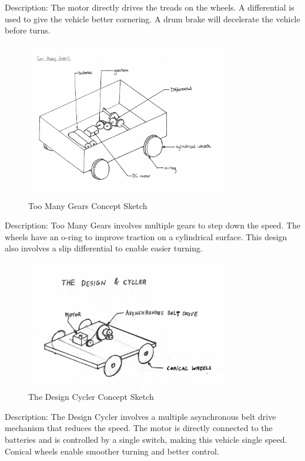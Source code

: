 \documentclass[class=../report, crop=false]{standalone}
\begin{document}
Description: The motor directly drives the treads on the wheels.
A differential is used to give the vehicle better cornering.
A drum brake will decelerate the vehicle before turns.
\clearpage

\begin{figure}[H]
	\centering
	\includegraphics[width=0.8\textwidth]{../../res/img/tmg}
	\caption{Too Many Gears Concept Sketch}
	\label{app/fig:tmg}
\end{figure}

Description: Too Many Gears involves multiple gears to step down the speed.
The wheels have an o-ring to improve traction on a cylindrical surface.
This design also involves a slip differential to enable easier turning.
\clearpage

\begin{figure}[H]
	\centering
	\includegraphics[width=0.8\textwidth]{../../res/img/designcycler}
	\caption{The Design Cycler Concept Sketch}
	\label{app/fig:designcycler}
\end{figure}

Description: The Design Cycler involves a multiple asynchronous belt drive mechanism that reduces the speed.
The motor is directly connected to the batteries and is controlled by a single switch, making this vehicle single speed.
Conical wheels enable smoother turning and better control.
\clearpage
\end{document}
